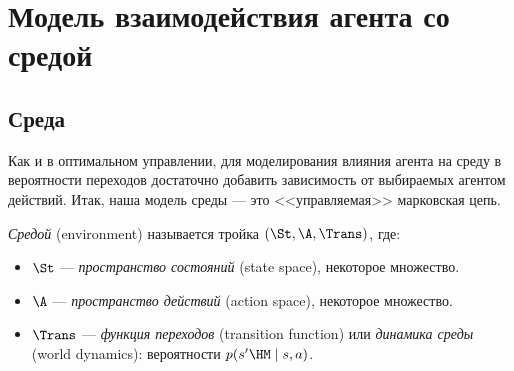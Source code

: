 \section{Модель взаимодействия агента со средой}

\subsection{Среда}

Как и в оптимальном управлении, для моделирования влияния агента на среду в вероятности переходов достаточно добавить зависимость от выбираемых агентом действий. Итак, наша модель среды --- это <<управляемая>> марковская цепь.

\begin{definition} 
\emph{Средой} (environment) называется тройка $(\St, \A, \Trans)$, где: 
\begin{itemize}
    \item $\St$ --- \emph{пространство состояний} (state space), некоторое множество.
    \item $\A$ --- \emph{пространство действий} (action space), некоторое множество.
    \item $\Trans$ --- \emph{функция переходов} (transition function) или \emph{динамика среды} (world dynamics): вероятности $p(s' \HM\mid s, a)$.
\end{itemize}
\end{definition}


